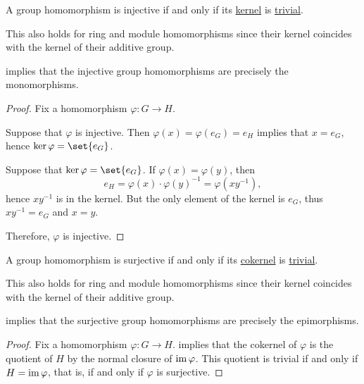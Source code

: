 \begin{proposition}\label{thm:group_homomorphism_trivial_kernel}
  A group homomorphism is injective if and only if its \hyperref[def:group/kernel]{kernel} is \hyperref[def:group/trivial]{trivial}.
\end{proposition}
\begin{comments}
  \item This also holds for ring and module homomorphisms since their kernel coincides with the kernel of their additive group.

  \item {} implies that the injective group homomorphisms are precisely the monomorphisms.
\end{comments}
\begin{proof}
  Fix a homomorphism \( \varphi: G \to H \).

  \SufficiencySubProof Suppose that \( \varphi \) is injective. Then \( \varphi(x) = \varphi(e_G) = e_H \) implies that \( x = e_G \), hence \( \ker \varphi = \set{ e_G } \).

  \NecessitySubProof Suppose that \( \ker \varphi = \set{ e_G } \). If \( \varphi(x) = \varphi(y) \), then
  \begin{equation*}
    e_H = \varphi(x) \cdot \varphi(y)^{-1} = \varphi(xy^{-1}),
  \end{equation*}
  hence \( x y^{-1} \) is in the kernel. But the only element of the kernel is \( e_G \), thus \( x y^{-1} = e_G \) and \( x = y \).

  Therefore, \( \varphi \) is injective.
\end{proof}

\begin{proposition}\label{thm:group_homomorphism_zero_cokernel}
  A group homomorphism is surjective if and only if its \hyperref[def:group/kernel]{cokernel} is \hyperref[def:group/trivial]{trivial}.
\end{proposition}
\begin{comments}
  \item This also holds for ring and module homomorphisms since their kernel coincides with the kernel of their additive group.

  \item {} implies that the surjective group homomorphisms are precisely the epimorphisms.
\end{comments}
\begin{proof}
  Fix a homomorphism \( \varphi: G \to H \).  implies that the cokernel of \( \varphi \) is the quotient of \( H \) by the normal closure of \( \operatorname{im} \varphi \). This quotient is trivial if and only if \( H = \operatorname{im} \varphi \), that is, if and only if \( \varphi \) is surjective.
\end{proof}

